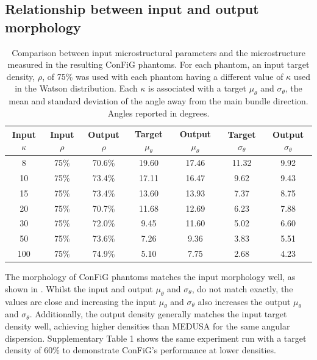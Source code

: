 \subsection{Relationship between input and output morphology}
\label{sec:config_result_input_output_rel}
\begin{table}[]
\caption{Comparison between input microstructural parameters and the microstructure measured in the resulting ConFiG phantoms. For each phantom, an input target density, $\rho$, of 75\% was used with each phantom having a different value of $\kappa$ used in the Watson distribution. Each $\kappa$ is associated with a target $\mu_\theta$ and $\sigma_\theta$, the mean and standard deviation of the angle away from the main bundle direction. Angles reported in degrees.}
\label{tab:micro_input_vs_output}
\begin{tabular}{ccccccc}
  \toprule
  Input $\kappa$ & Input $\rho$ & Output $\rho$ & Target $\mu_\theta$ & Output $\mu_\theta$ & Target $\sigma_\theta$ & Output $\sigma_\theta$\\\midrule
8        & 75\%     & 70.6\%    & 19.60     & 17.46     & 11.32     & 9.92   \\
10       & 75\%     & 73.4\%    & 17.11     & 16.47     & 9.62      & 9.43   \\
15       & 75\%     & 73.4\%    & 13.60     & 13.93     & 7.37      & 8.75   \\
20       & 75\%     & 70.7\%    & 11.68     & 12.69     & 6.23      & 7.88   \\
30       & 75\%     & 72.0\%    & 9.45      & 11.60     & 5.02      & 6.60   \\
50       & 75\%     & 73.6\%    & 7.26      & 9.36      & 3.83      & 5.51   \\
100      & 75\%     & 74.9\%    & 5.10      & 7.75      & 2.68      & 4.23 \\\bottomrule
\end{tabular}
\end{table}

The morphology of ConFiG phantoms matches the input morphology well, as shown in . Whilst the input and output $\mu_\theta$ and $\sigma_\theta$, do not match exactly, the values are close and increasing the input $\mu_\theta$ and $\sigma_\theta$ also increases the output $\mu_\theta$ and $\sigma_\theta$. Additionally, the output density generally matches the input target density well, achieving higher densities than MEDUSA for the same angular dispersion. Supplementary Table 1 shows the same experiment run with a target density of 60\% to demonstrate ConFiG’s performance at lower densities.


